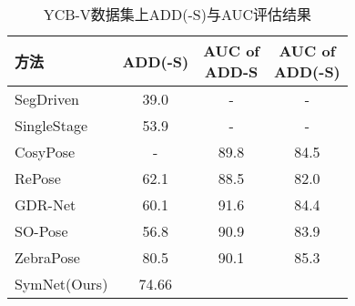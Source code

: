 \begin{table}
  \centering
  \caption{YCB-V数据集上ADD(-S)与AUC评估结果}
  \begin{tabular}{@{}l|c|c|c@{}}
    \toprule
     方法 & ADD(-S) & \makecell{AUC of\\ADD-S} & \makecell{AUC of\\ADD(-S)} \\
    \midrule
    SegDriven\cite{2019segmentation} & 39.0 &  - &  -  \\
    SingleStage\cite{hu2020single} & 53.9 &  - &  - \\
    CosyPose~\cite{labbe2020cosypose} & - &  89.8 &  84.5 \\
    RePose~\cite{iwase2021repose} & 62.1 &  88.5 &  82.0 \\
    GDR-Net~\cite{wang2021gdr} & 60.1 & 91.6 &  84.4 \\
    SO-Pose~\cite{di2021so} & 56.8 &  90.9 &  83.9 \\
    ZebraPose~\cite{su2022zebrapose} & 80.5 &  90.1 & 85.3  \\
    SymNet(Ours) & 74.66 & 
    \bottomrule
  \end{tabular}
  \label{tab:ycbv_results_table}
\end{table}